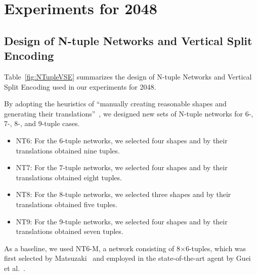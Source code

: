 \section{Experiments for 2048}

\subsection{Design of N-tuple Networks and Vertical Split Encoding}


Table~\ref{fig:NTupleVSE} summarizes the design of N-tuple Networks and Vertical Split Encoding
used in our experiments for 2048.

By adopting the heuristics of ``manually creating reasonable shapes and generating their translations''~\cite{Jask18}, we designed new sets of N-tuple networks for 6-, 7-, 8-, and 9-tuple cases.
\begin{itemize}
\item NT6: For the 6-tuple networks, we selected four shapes and by their translations obtained nine tuples.
\item NT7: For the 7-tuple networks, we selected four shapes and by their translations obtained eight tuples.
\item NT8: For the 8-tuple networks, we selected three shapes and by their translations obtained five tuples.
\item NT9: For the 9-tuple networks, we selected four shapes and by their translations obtained seven tuples.
\end{itemize}
As a baseline, we used NT6-M, a network consisting of 8$\times$6-tuples, which was first selected by Matsuzaki~\cite{Mats16} and employed in the state-of-the-art agent by Guei et al.~\cite{GuCW22}.

